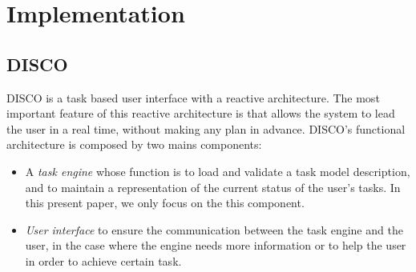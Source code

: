 
\chapter{Implementation} %

\label{Chapter 5} %



\section{DISCO}
DISCO \cite{rich2009building}is a task based user interface with a reactive architecture. The  most important feature of this reactive architecture is that allows the system to lead the user in a real time, without making any plan in advance. DISCO's functional architecture is composed by two mains components:
 \begin{itemize}
 	\item A \textit{task engine} whose function is to load and validate a task model description, and to maintain a representation	of the current status of the user’s tasks.\cite{rich2009building} In this present paper, we only focus on the this component. 
 	\item \textit{User interface} to ensure the communication between the task engine and the user, in the case where the engine needs more information or to help the user in order to achieve certain task.
 	

 \end{itemize}
